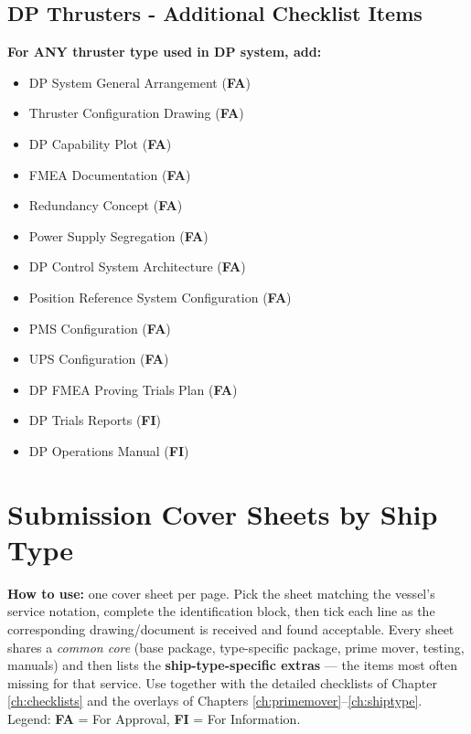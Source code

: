 \documentclass[11pt,a4paper]{report}
\newcommand{\fa}{\textbf{\textcolor{warningred}{FA}}}
\newcommand{\fic}{\textbf{\textcolor{bvgray}{FI}}}
\begin{document}
\section{DP Thrusters - Additional Checklist Items}

\textbf{For ANY thruster type used in DP system, add:}
\begin{itemize}[label=$\square$]
\item DP System General Arrangement (\fa{})
\item Thruster Configuration Drawing (\fa{})
\item DP Capability Plot (\fa{})
\item FMEA Documentation (\fa{})
\item Redundancy Concept (\fa{})
\item Power Supply Segregation (\fa{})
\item DP Control System Architecture (\fa{})
\item Position Reference System Configuration (\fa{})
\item PMS Configuration (\fa{})
\item UPS Configuration (\fa{})
\item DP FMEA Proving Trials Plan (\fa{})
\item DP Trials Reports (\fic{})
\item DP Operations Manual (\fic{})
\end{itemize}

\newpage

\chapter{Submission Cover Sheets by Ship Type}
\label{ch:coversheets}

\textbf{How to use:} one cover sheet per page. Pick the sheet matching the
vessel's service notation, complete the identification block, then tick each
line as the corresponding drawing/document is received and found acceptable.
Every sheet shares a \emph{common core} (base package, type-specific package,
prime mover, testing, manuals) and then lists the \textbf{ship-type-specific
extras} --- the items most often missing for that service. Use together with the
detailed checklists of Chapter \ref{ch:checklists} and the overlays of
Chapters \ref{ch:primemover}--\ref{ch:shiptype}.
Legend: \fa{} = For Approval, \fic{} = For Information.
\end{document}

